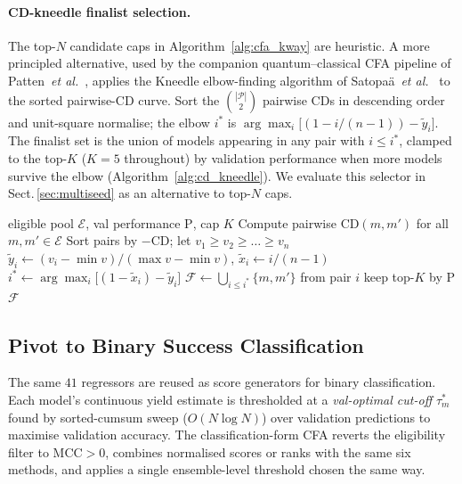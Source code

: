 \documentclass[conference]{IEEEtran}
\begin{document}
\paragraph{CD-kneedle finalist selection.}
The top-$N$ candidate caps in Algorithm~\ref{alg:cfa_kway} are
heuristic. A more principled alternative, used by the companion
quantum--classical CFA pipeline of
Patten~\textit{et al.}~\cite{Patten2026Quantum}, applies the Kneedle
elbow-finding algorithm of Satopa{\"a}~\textit{et
al.}~\cite{Satopaa2011Knee} to the sorted pairwise-CD curve. Sort the
$\binom{|\mathcal{P}|}{2}$ pairwise CDs in descending order and unit-square
normalise; the elbow $i^{*}$ is
$\arg\max_{i}\!\bigl[(1-i/(n-1))-\tilde{y}_{i}\bigr]$. The finalist set is
the union of models appearing in any pair with
$i\!\le\!i^{*}$, clamped to the top-$K$ ($K\!=\!5$ throughout) by
validation performance when more models survive the elbow
(Algorithm~\ref{alg:cd_kneedle}). We evaluate this selector in
Sect.\,\ref{sec:multiseed} as an alternative to top-$N$ caps.

\begin{algorithm}[t]
\caption{CD-kneedle finalist selection (Patten~\textit{et al.}~\cite{Patten2026Quantum} convention)}
\label{alg:cd_kneedle}
\begin{algorithmic}[1]
\Require eligible pool $\mathcal{E}$, val performance $\mathrm{P}$, cap $K$
\State Compute pairwise $\mathrm{CD}(m,m')$ for all $m,m'\in\mathcal{E}$
\State Sort pairs by $-\mathrm{CD}$; let $v_{1}\!\geq\!v_{2}\!\geq\!\ldots\!\geq\!v_{n}$
\State $\tilde{y}_{i} \gets (v_{i}-\min v) / (\max v - \min v)$,
       $\tilde{x}_{i} \gets i/(n-1)$
\State $i^{*} \gets \arg\max_{i}\bigl[(1-\tilde{x}_{i})-\tilde{y}_{i}\bigr]$
\State $\mathcal{F} \gets \bigcup_{i\le i^{*}}\{m,m'\}$ from pair $i$
 keep top-$K$ by $\mathrm{P}$
\EndIf
\State \Return $\mathcal{F}$
\end{algorithmic}
\end{algorithm}

\subsection{Pivot to Binary Success Classification}
The same $41$ regressors are reused as score generators for binary
classification. Each model's continuous yield estimate is thresholded at a
\emph{val-optimal cut-off} $\tau_{m}^{*}$ found by sorted-cumsum sweep
($O(N\log N)$) over validation predictions to maximise validation accuracy.
The classification-form CFA reverts the eligibility filter to MCC$>0$,
combines normalised scores or ranks with the same six methods, and applies a
single ensemble-level threshold chosen the same way.
\end{document}
